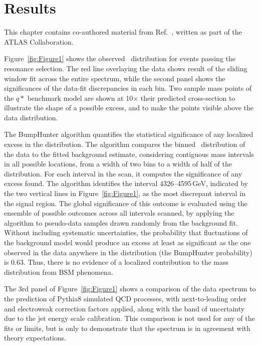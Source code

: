 
\chapter{Results}
\label{ch:Results}
This chapter contains co-authored material from Ref.~\cite{Dijet2017}, written as part of the ATLAS Collaboration.
\newline

Figure~\ref{fig:Figure1} shows the observed \mjj~distribution for events passing the resonance selection.  The red line overlaying the data shows result of the sliding window fit across the entire spectrum, while the second panel shows the significances of the data-fit discrepancies in each bin.  Two sample mass points of the $q*$ benchmark model are shown at 10$\times$ their predicted cross-section to illustrate the shape of a possible excess, and to make the points visible above the data distribution.

The BumpHunter algorithm quantifies the statistical significance of any localized excess in the \mjj distribution.  The algorithm compares the binned \mjj~distribution of the data to the fitted background estimate, considering contiguous mass intervals in all possible locations, from a width of two bins to a width of half of the distribution. For each interval in the scan, it computes the significance of any excess found. The algorithm identifies the interval 4326–4595\,GeV, indicated by the two vertical lines in Figure~\ref{fig:Figure1}, as the most discrepant interval in the signal region. The global significance of this outcome is evaluated using the ensemble of possible outcomes across all intervals scanned, by applying the algorithm to pseudo-data samples drawn randomly from the background fit. Without including systematic uncertainties, the probability that fluctuations of the background model would produce an excess at least as significant as the one observed in the data anywhere in the distribution (the BumpHunter probability) is 0.63. Thus, there is no evidence of a localized contribution to the mass distribution from BSM phenomena.

The 3rd panel of Figure~\ref{fig:Figure1} shows a comparison of the data spectrum to the prediction of Pythia8 simulated QCD processes, with next-to-leading order and electroweak correction factors applied, along with the band of uncertainty due to the jet energy scale calibration.  This comparison is not used for any of the fits or limits, but is only to demonstrate that the spectrum is in agreement with theory expectations.

